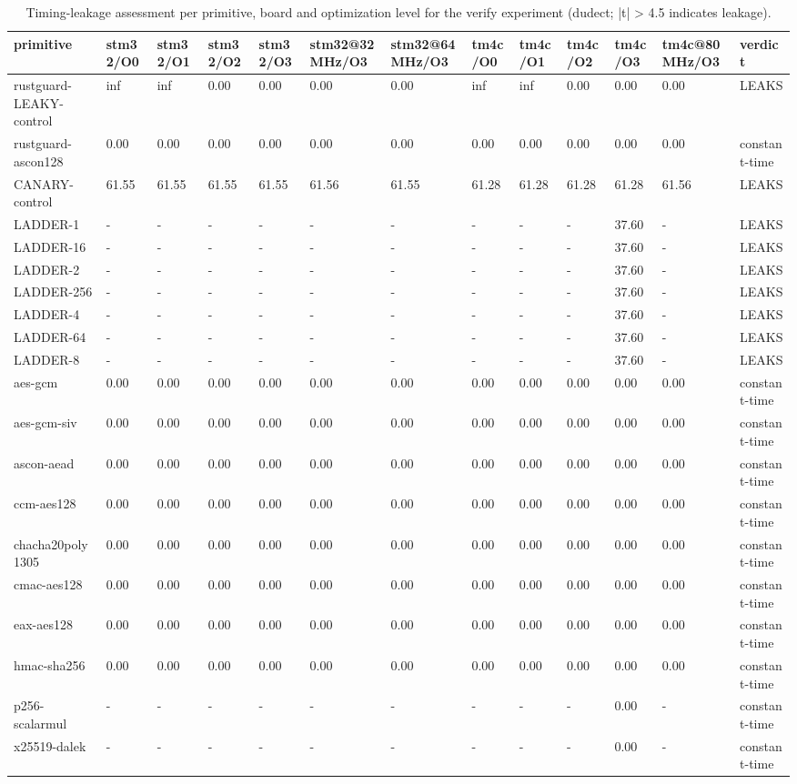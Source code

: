 \begin{table}[t]
  \centering
  \caption{Timing-leakage assessment per primitive, board and optimization level for the verify experiment (dudect; |t| > 4.5 indicates leakage).}
  \label{tab:leakagematrix}
  \begin{tabular}{lllllllllllll}
    \toprule
    primitive & stm32/O0 & stm32/O1 & stm32/O2 & stm32/O3 & stm32@32MHz/O3 & stm32@64MHz/O3 & tm4c/O0 & tm4c/O1 & tm4c/O2 & tm4c/O3 & tm4c@80MHz/O3 & verdict \\
    \midrule
    rustguard-LEAKY-control & inf & inf & 0.00 & 0.00 & 0.00 & 0.00 & inf & inf & 0.00 & 0.00 & 0.00 & LEAKS \\
    rustguard-ascon128 & 0.00 & 0.00 & 0.00 & 0.00 & 0.00 & 0.00 & 0.00 & 0.00 & 0.00 & 0.00 & 0.00 & constant-time \\
    CANARY-control & 61.55 & 61.55 & 61.55 & 61.55 & 61.56 & 61.55 & 61.28 & 61.28 & 61.28 & 61.28 & 61.56 & LEAKS \\
    LADDER-1 & - & - & - & - & - & - & - & - & - & 37.60 & - & LEAKS \\
    LADDER-16 & - & - & - & - & - & - & - & - & - & 37.60 & - & LEAKS \\
    LADDER-2 & - & - & - & - & - & - & - & - & - & 37.60 & - & LEAKS \\
    LADDER-256 & - & - & - & - & - & - & - & - & - & 37.60 & - & LEAKS \\
    LADDER-4 & - & - & - & - & - & - & - & - & - & 37.60 & - & LEAKS \\
    LADDER-64 & - & - & - & - & - & - & - & - & - & 37.60 & - & LEAKS \\
    LADDER-8 & - & - & - & - & - & - & - & - & - & 37.60 & - & LEAKS \\
    aes-gcm & 0.00 & 0.00 & 0.00 & 0.00 & 0.00 & 0.00 & 0.00 & 0.00 & 0.00 & 0.00 & 0.00 & constant-time \\
    aes-gcm-siv & 0.00 & 0.00 & 0.00 & 0.00 & 0.00 & 0.00 & 0.00 & 0.00 & 0.00 & 0.00 & 0.00 & constant-time \\
    ascon-aead & 0.00 & 0.00 & 0.00 & 0.00 & 0.00 & 0.00 & 0.00 & 0.00 & 0.00 & 0.00 & 0.00 & constant-time \\
    ccm-aes128 & 0.00 & 0.00 & 0.00 & 0.00 & 0.00 & 0.00 & 0.00 & 0.00 & 0.00 & 0.00 & 0.00 & constant-time \\
    chacha20poly1305 & 0.00 & 0.00 & 0.00 & 0.00 & 0.00 & 0.00 & 0.00 & 0.00 & 0.00 & 0.00 & 0.00 & constant-time \\
    cmac-aes128 & 0.00 & 0.00 & 0.00 & 0.00 & 0.00 & 0.00 & 0.00 & 0.00 & 0.00 & 0.00 & 0.00 & constant-time \\
    eax-aes128 & 0.00 & 0.00 & 0.00 & 0.00 & 0.00 & 0.00 & 0.00 & 0.00 & 0.00 & 0.00 & 0.00 & constant-time \\
    hmac-sha256 & 0.00 & 0.00 & 0.00 & 0.00 & 0.00 & 0.00 & 0.00 & 0.00 & 0.00 & 0.00 & 0.00 & constant-time \\
    p256-scalarmul & - & - & - & - & - & - & - & - & - & 0.00 & - & constant-time \\
    x25519-dalek & - & - & - & - & - & - & - & - & - & 0.00 & - & constant-time \\
    \bottomrule
  \end{tabular}
\end{table}
